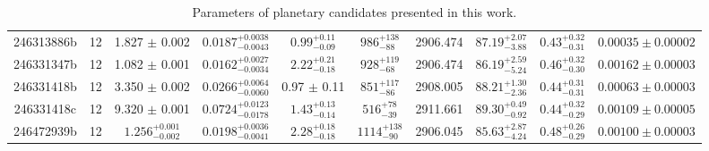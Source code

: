 \begin{table}
\begin{tabular}{cccccccccc}
    246313886b     & 12 & 1.827 $\pm$ 0.002  & $0.0187^{+0.0038}_{-0.0043}$  & $0.99^{+0.11}_{-0.09}$ & $986^{+138}_{-88}$ & 2906.474 & $87.19^{+2.07}_{-3.88}$ & $0.43^{+0.32}_{-0.31}$ & $0.00035 \pm 0.00002$\\
    246331347b     & 12 & 1.082 $\pm$ 0.001  & $0.0162^{+0.0027}_{-0.0034}$  & $2.22^{+0.21}_{-0.18}$ & $928^{+119}_{-68}$ & 2906.474 & $86.19^{+2.59}_{-5.24}$ & $0.46^{+0.32}_{-0.30}$ & $0.00162 \pm 0.00003$ \\
    246331418b     & 12 & 3.350 $\pm$ 0.002  & $0.0266^{+0.0064}_{-0.0060}$  & 0.97 $\pm$ 0.11 & $851^{+117}_{-86}$ & 2908.005 & $88.21^{+1.30}_{-2.36}$ & $0.44^{+0.31}_{-0.31}$ & $0.00063 \pm 0.00003$ \\
    246331418c     & 12 & 9.320 $\pm$ 0.001  & $0.0724^{+0.0123}_{-0.0178}$  & $1.43^{+0.13}_{-0.14}$ & $516^{+78}_{-39}$ & 2911.661 & $89.30^{+0.49}_{-0.92}$ & $0.44^{+0.32}_{-0.29}$ & $0.00109 \pm 0.00005$ \\
    246472939b     & 12 & $1.256^{+0.001}_{-0.002}$  & $0.0198^{+0.0036}_{-0.0041}$  & $2.28^{+0.18}_{-0.18}$ & $1114^{+138}_{-90}$ & 2906.045 & $85.63^{+2.87}_{-4.24}$ & $0.48^{+0.26}_{-0.29}$ & $0.00100 \pm 0.00003$\\
    
    \hline
\end{tabular}
   
 \\
\caption{\label{tab:planet_params}Parameters of planetary candidates presented in this work.}
\end{table}
